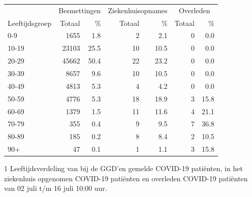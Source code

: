 \documentclass[
  english,
  man,floatsintext]{apa6}
\begin{document}
\begin{table}
\centering\begingroup\fontsize{11}{13}\selectfont

\begin{threeparttable}
\begin{tabular}{lrrrrrr}
\toprule
\multicolumn{1}{c}{ } & \multicolumn{2}{c}{Besmettingen} & \multicolumn{2}{c}{Ziekenhuisopnames} & \multicolumn{2}{c}{Overleden} \\
\cmidrule(l{3pt}r{3pt}){2-3} \cmidrule(l{3pt}r{3pt}){4-5} \cmidrule(l{3pt}r{3pt}){6-7}
Leeftijdsgroep & Totaal & \% & Totaal & \% & Totaal & \%\\
\midrule
0-9 & 1655 & 1.8 & 2 & 2.1 & 0 & 0.0\\
10-19 & 23103 & 25.5 & 10 & 10.5 & 0 & 0.0\\
20-29 & 45662 & 50.4 & 22 & 23.2 & 0 & 0.0\\
30-39 & 8657 & 9.6 & 10 & 10.5 & 0 & 0.0\\
40-49 & 4813 & 5.3 & 4 & 4.2 & 0 & 0.0\\
50-59 & 4776 & 5.3 & 18 & 18.9 & 3 & 15.8\\
60-69 & 1379 & 1.5 & 11 & 11.6 & 4 & 21.1\\
70-79 & 355 & 0.4 & 9 & 9.5 & 7 & 36.8\\
80-89 & 185 & 0.2 & 8 & 8.4 & 2 & 10.5\\
90+ & 47 & 0.1 & 1 & 1.1 & 3 & 15.8\\
\bottomrule
\end{tabular}
\begin{tablenotes}
\item[1] Leeftijdsverdeling van bij de GGD’en gemelde COVID-19 patiënten, in het ziekenhuis opgenomen COVID-19 patiënten en overleden COVID-19 patiënten van 02 juli t/m 16 juli 10:00 uur.
\end{tablenotes}
\end{threeparttable}
\endgroup{}
\end{table}

\newpage
\end{document}
